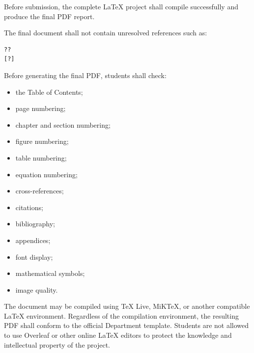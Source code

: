 {\vspace{0.3cm}



Before submission, the complete \LaTeX{} project shall compile
successfully and produce the final PDF report.

The final document shall not contain unresolved references such as:

\begin{verbatim}
??
[?]
\end{verbatim}

Before generating the final PDF, students shall check:

\begin{itemize}[leftmargin=0.8cm, itemsep=2pt]
    \item the Table of Contents;
    \item page numbering;
    \item chapter and section numbering;
    \item figure numbering;
    \item table numbering;
    \item equation numbering;
    \item cross-references;
    \item citations;
    \item bibliography;
    \item appendices;
    \item font display;
    \item mathematical symbols;
    \item image quality.
\end{itemize}

The document may be compiled using TeX Live, MiKTeX, or
another compatible \LaTeX{} environment. Regardless of the
compilation environment, the resulting PDF shall conform to the
official Department template. Students are not allowed to use Overleaf
or other online \LaTeX{} editors to protect the 
knowledge and intellectual property of the project.

\vspace{0.3cm}


}

